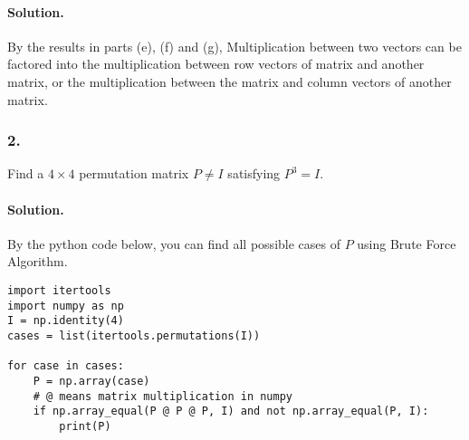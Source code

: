 \paragraph{Solution.}
By the results in parts (e), (f) and (g), Multiplication between two vectors can be factored into the multiplication between row vectors of matrix and another matrix, or the multiplication between the matrix and column vectors of another matrix.
\newpage
\subsubsection{2.} Find a $4\times4$ permutation matrix $P\neq I$ satisfying $P^3 = I$.
\paragraph{Solution.}
By the python code below, you can find all possible cases of $P$ using Brute Force Algorithm.\\
\begin{verbatim}
import itertools
import numpy as np
I = np.identity(4)
cases = list(itertools.permutations(I))

for case in cases:
    P = np.array(case)
    # @ means matrix multiplication in numpy
    if np.array_equal(P @ P @ P, I) and not np.array_equal(P, I):
        print(P)
\end{verbatim}

